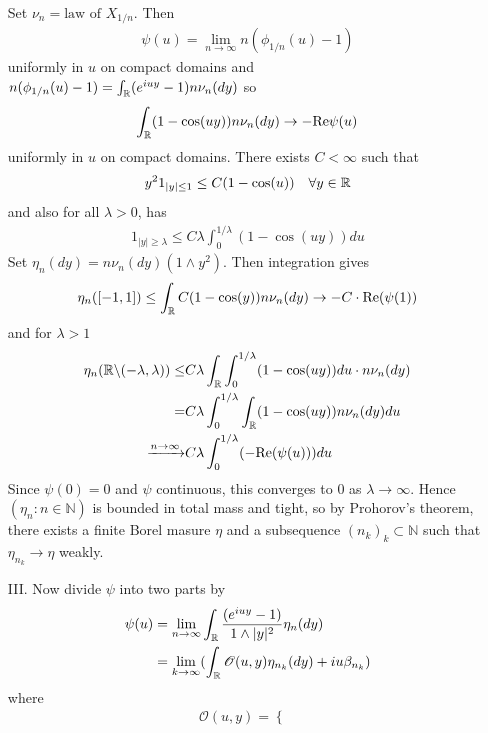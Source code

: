 \documentclass[12pt,a4paper]{report}
\newenvironment{proof}
{\begin{changemargin}{1cm}{0.5cm} 
	}%
	{\end{changemargin}
}
\begin{document}
\begin{proof}
\begin{itemize}
Set $\nu_n =\text{law of }X_{1/n}$. Then
\begin{align*}
\psi(u) = \lim_{n\rightarrow \infty} n( \phi_{1/n}(u) -1)
\end{align*}
uniformly in $u$ on compact domains and $n(\phi_{1/n}(u)-1) = \int_{\mathbb{R}} (e^{iuy}-1) n\nu_n(dy)$ so
\begin{align*}
\int_{\mathbb{R}} (1-\cos (uy)) n\nu_n (dy) \rightarrow - \text{Re} \psi(u)
\end{align*}
uniformly in $u$ on compact domains. There exists $C< \infty$ such that
\begin{align*}
y^2 1_{|y|\leq 1} \leq C (1-\cos (u)) \quad \forall y \in \mathbb{R}
\end{align*}
and also for all $\lambda >0$, has
\begin{align*}
1_{|y| \geq \lambda} \leq C\lambda \int_0^{1/\lambda} (1-\cos (uy)) du
\end{align*}
Set $\eta_n(dy) = n \nu_n (dy) (1\wedge y^2)$. Then integration gives 
\begin{align*}
\eta_n ([-1,1]) \leq \int_{\mathbb{R}} C(1-\cos (y)) n\nu_n (dy) \rightarrow -C \cdot \text{Re}(\psi(1))
\end{align*}
and for $\lambda >1$
\begin{align*}
\eta_n (\mathbb{R} \backslash (-\lambda, \lambda)) \leq & C \lambda \int_{\mathbb{R}} \int_0^{1/\lambda} (1- \cos (uy))du \cdot n \nu_n(dy) \\
=& C\lambda \int_0^{1/\lambda} \int_{\mathbb{R}} (1- \cos(uy)) n\nu_n (dy) du  \\
\xrightarrow{n\rightarrow \infty} &C \lambda \int_0^{1/\lambda} (-\text{Re}(\psi(u))) du
\end{align*}
Since $\psi(0)=0$ and $\psi$ continuous, this converges to 0 as $\lambda \rightarrow \infty$. Hence $(\eta_n : n\in \mathbb{N})$ is bounded in total mass and tight, so by Prohorov's theorem, there exists a finite Borel masure $\eta$ and a subsequence $(n_k)_k \subset \mathbb{N}$ such that $\eta_{n_k } \rightarrow \eta$ weakly.
\item[III.] Now divide $\psi$ into two parts by
\begin{align*}
\psi(u) &= \lim_{n\rightarrow \infty} \int_{\mathbb{R}} \frac{(e^{iuy}-1)}{1\wedge |y|^2} \eta_n(dy) \\
&= \lim_{k\rightarrow \infty} (\int_{\mathbb{R}} \mathscr{O}(u,y)\eta_{n_k}(dy)  + iu\beta_{n_k})
\end{align*}
where
\begin{align*}
\mathscr{O}(u,y) = \begin{cases}

\end{cases}
\end{align*}
\end{itemize}
\end{proof}
\end{document}
